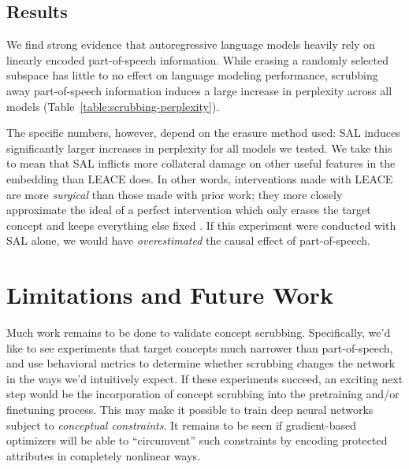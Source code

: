 \documentclass{article}
\theoremstyle{plain}
\theoremstyle{remark}
\theoremstyle{plain}
\theoremstyle{TheoremNum}
\begin{document}
\subsection{Results}

We find strong evidence that autoregressive language models heavily rely on linearly encoded part-of-speech information. While erasing a randomly selected subspace has little to no effect on language modeling performance, scrubbing away part-of-speech information induces a large increase in perplexity across all models (Table~\ref{table:scrubbing-perplexity}).

The specific numbers, however, depend on the erasure method used: SAL induces significantly larger increases in perplexity for all models we tested. We take this to mean that SAL inflicts more collateral damage on other useful features in the embedding than LEACE does. In other words, interventions made with LEACE are more \emph{surgical} than those made with prior work; they more closely approximate the ideal of a perfect intervention which only erases the target concept and keeps everything else fixed \cite{woodward2005making, grimsley2020attention}. If this experiment were conducted with SAL alone, we would have \emph{overestimated} the causal effect of part-of-speech. 




\section{Limitations and Future Work}
Much work remains to be done to validate concept scrubbing. Specifically, we'd like to see experiments that target concepts much narrower than part-of-speech, and use behavioral metrics to determine whether scrubbing changes the network in the ways we'd intuitively expect. If these experiments succeed, an exciting next step would be the incorporation of concept scrubbing into the pretraining and/or finetuning process. This may make it possible to train deep neural networks subject to \emph{conceptual constraints}. It remains to be seen if gradient-based optimizers will be able to ``circumvent'' such constraints by encoding protected attributes in completely nonlinear ways.
\end{document}
